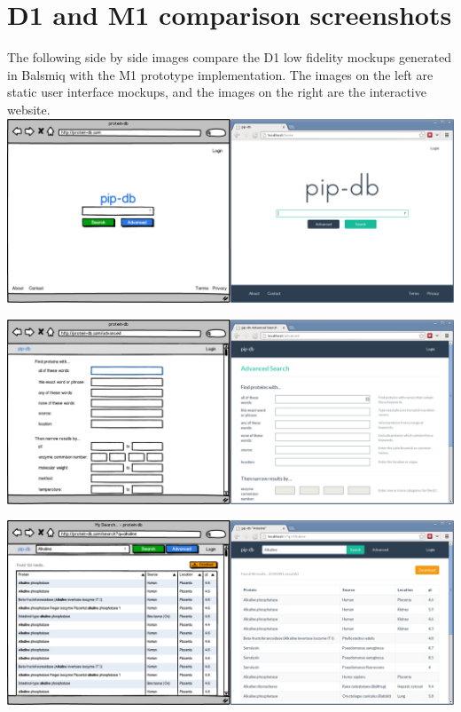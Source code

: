 \chapter{D1 and M1 comparison screenshots}\label{app:d1-m1-comparison}

The following side by side images compare the D1 low fidelity mockups
generated in Balsmiq with the M1 prototype implementation. The images
on the left are static user interface mockups, and the images on the
right are the interactive website.\\

\noindent\includegraphics[width=\textwidth]{assets/m1-comparison-homepage}\br{}

\noindent\includegraphics[width=\textwidth]{assets/m1-comparison-advanced}\br{}

\noindent\includegraphics[width=\textwidth]{assets/m1-comparison-results}\br{}

